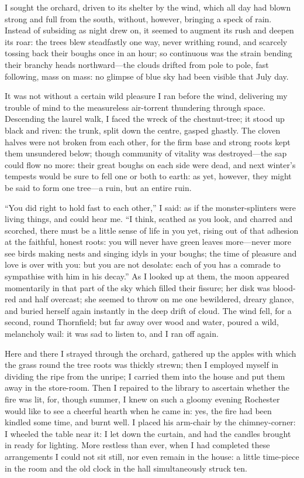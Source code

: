 I sought the orchard, driven to its shelter by the wind, which all day
had blown strong and full from the south, without, however, bringing a
speck of rain.  Instead of subsiding as night drew on, it seemed to
augment its rush and deepen its roar: the trees blew steadfastly one
way, never writhing round, and scarcely tossing back their boughs once
in an hour; so continuous was the strain bending their branchy heads
northward---the clouds drifted from pole to pole, fast following, mass
on mass: no glimpse of blue sky had been visible that July day.

It was not without a certain wild pleasure I ran before the wind,
delivering my trouble of mind to the measureless air-torrent thundering
through space.  Descending the laurel walk, I faced the wreck of the
chestnut-tree; it stood up black and riven: the trunk, split down the
centre, gasped ghastly.  The cloven halves were not broken from each
other, for the firm base and strong roots kept them unsundered below;
though community of vitality was destroyed---the sap could flow no more:
their great boughs on each side were dead, and next winter's tempests
would be sure to fell one or both to earth: as yet, however, they might
be said to form one tree---a ruin, but an entire ruin.

\enquote{You did right to hold fast to each other,} I said: as if the
monster-splinters were living things, and could hear me.  \enquote{I
think, scathed as you look, and charred and scorched, there must be a
little sense of life in you yet, rising out of that adhesion at the
faithful, honest roots: you will never have green leaves more---never
more see birds making nests and singing idyls in your boughs; the time
of pleasure and love is over with you: but you are not desolate: each of
you has a comrade to sympathise with him in his decay.}  As I looked up
at them, the moon appeared momentarily in that part of the sky which
filled their fissure; her disk was blood-red and half overcast; she
seemed to throw on me one bewildered, dreary glance, and buried herself
again instantly in the deep drift of cloud.  The wind fell, for a
second, round Thornfield; but far away over wood and water, poured a
wild, melancholy wail: it was sad to listen to, and I ran off again.

Here and there I strayed through the orchard, gathered up the apples
with which the grass round the tree roots was thickly strewn; then I
employed myself in dividing the ripe from the unripe; I carried them
into the house and put them away in the store-room.  Then I repaired to
the library to ascertain whether the fire was lit, for, though summer, I
knew on such a gloomy evening \Mr{} Rochester would like to see a cheerful
hearth when he came in: yes, the fire had been kindled some time, and
burnt well.  I placed his arm-chair by the chimney-corner: I wheeled the
table near it: I let down the curtain, and had the candles brought in
ready for lighting.  More restless than ever, when I had completed these
arrangements I could not sit still, nor even remain in the house: a
little time-piece in the room and the old clock in the hall
simultaneously struck ten.

